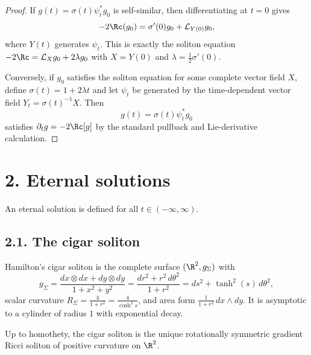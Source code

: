 \begin{proof}
\sketch If \(g(t)=\sigma(t)\psi_t^*g_0\) is self-similar, then differentiating at
\(t=0\) gives
\[
-2\Rc(g_0)=\sigma'(0)g_0+\mathcal L_{Y(0)}g_0,
\]
where \(Y(t)\) generates \(\psi_t\). This is exactly the soliton equation
\(-2\Rc=\mathcal L_X g_0+2\lambda g_0\) with \(X=Y(0)\) and
\(\lambda=\frac12\sigma'(0)\).

Conversely, if \(g_0\) satisfies the soliton equation for some complete vector
field \(X\), define \(\sigma(t)=1+2\lambda t\) and let \(\psi_t\) be generated by
the time-dependent vector field \(Y_t=\sigma(t)^{-1}X\). Then
\[
g(t)=\sigma(t)\psi_t^*g_0
\]
satisfies \(\partial_t g=-2\Rc[g]\) by the standard pullback and Lie-derivative
calculation.
\end{proof}

\section*{2. Eternal solutions}

An eternal solution is defined for all \(t\in(-\infty,\infty)\).

\subsection*{2.1. The cigar soliton}

\begin{example}
\label{ch02-ex-cigar-soliton}
Hamilton's cigar soliton is the complete surface \((\R^2,g_\Sigma)\) with
\[
g_\Sigma=\frac{dx\otimes dx+dy\otimes dy}{1+x^2+y^2}
=\frac{dr^2+r^2\,d\theta^2}{1+r^2}
=ds^2+\tanh^2(s)\,d\theta^2,
\]
scalar curvature \(R_\Sigma=\frac{4}{1+r^2}=\frac{4}{\cosh^2 s}\), and area form
\(\frac{1}{1+r^2}\,dx\wedge dy\). It is asymptotic to a cylinder of radius \(1\)
with exponential decay.
\end{example}

\begin{lemma}
\label{ch02-lem-cigars-unique}
Up to homothety, the cigar soliton is the unique rotationally symmetric
gradient Ricci soliton of positive curvature on \(\R^2\).
\end{lemma}

